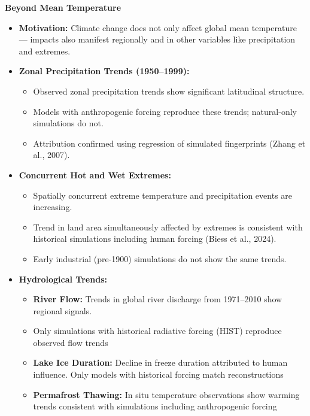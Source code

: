 \documentclass[fontsize=8pt, a4paper, landscape, fleqn]{scrartcl}
\renewcommand{\subsection}[1]{%
    \noindent\colorbox{subsectioncolor}{%
        \parbox{\dimexpr\columnwidth-2\fboxsep}{\color{white}\textbf{#1}}}%
    \vspace{0.5mm}%
}
\begin{document}
\begin{multicols*}{3}[\raggedcolumns]
\subsection{Beyond Mean Temperature}

\begin{itemize}
    \item \textbf{Motivation:} Climate change does not only affect global mean temperature — impacts also manifest regionally and in other variables like precipitation and extremes.
    
    \item \textbf{Zonal Precipitation Trends (1950–1999):}
    \begin{itemize}
        \item Observed zonal precipitation trends show significant latitudinal structure.
        \item Models with anthropogenic forcing reproduce these trends; natural-only simulations do not.
        \item Attribution confirmed using regression of simulated fingerprints (Zhang et al., 2007).
    \end{itemize}
    
    \item \textbf{Concurrent Hot and Wet Extremes:}
    \begin{itemize}
        \item Spatially concurrent extreme temperature and precipitation events are increasing.
        \item Trend in land area simultaneously affected by extremes is consistent with historical simulations including human forcing (Biess et al., 2024).
        \item Early industrial (pre-1900) simulations do not show the same trends.
    \end{itemize}

    \item \textbf{Hydrological Trends:}
    \begin{itemize}
        \item \textbf{River Flow:} Trends in global river discharge from 1971–2010 show regional signals.
        \item Only simulations with historical radiative forcing (HIST) reproduce observed flow trends 
        \item \textbf{Lake Ice Duration:} Decline in freeze duration attributed to human influence. Only models with historical forcing match reconstructions 
        \item \textbf{Permafrost Thawing:} In situ temperature observations show warming trends consistent with simulations including anthropogenic forcing 
    \end{itemize}
    

\end{itemize}
\end{multicols*}
\end{document}
